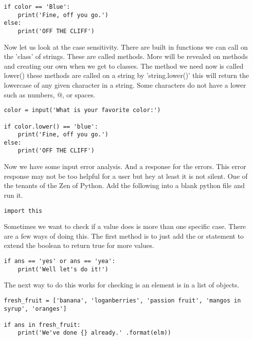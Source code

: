 \documentclass[../main.tex]{subfiles}
\begin{document}
\begin{lstlisting}
if color == 'Blue':
    print('Fine, off you go.')
else:
    print('OFF THE CLIFF')
\end{lstlisting}
Now let us look at the case sensitivity. There are built in functions we can call on the 'class' of strings. These are called methods. More will be revealed on methods and creating our own when we get to classes. The method we need now is called lower() these methods are called on a string by 'string.lower()' this will return the lowercase of any given character in a string. Some characters do not have a lower such as numbers, @, or spaces.
\begin{lstlisting}
color = input('What is your favorite color:')

if color.lower() == 'blue':
    print('Fine, off you go.')
else:
    print('OFF THE CLIFF')
\end{lstlisting}
Now we have some input error analysis. And a response for the errors. This error response may not be too helpful for a user but hey at least it is not silent. One of the tenants of the Zen of Python. Add the following into a blank python file and run it.\\
\begin{lstlisting}
import this
\end{lstlisting}
Sometimes we want to check if a value does is more than one specific case. There are a few ways of doing this. The first method is to just add the or statement to extend the boolean to return true for more values.\\
\begin{lstlisting}
if ans == 'yes' or ans == 'yea':
    print('Well let's do it!')
\end{lstlisting}
The next way to do this works for checking is an element is in a list of objects.\\
\begin{lstlisting}
fresh_fruit = ['banana', 'loganberries', 'passion fruit', 'mangos in syrup', 'oranges']

if ans in fresh_fruit:
    print('We've done {} already.' .format(elm))

\end{lstlisting}
\end{document}
